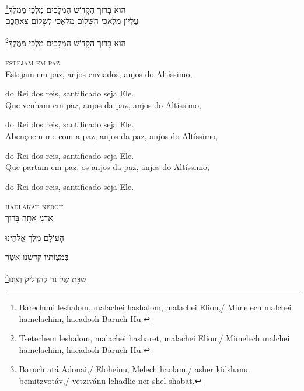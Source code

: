 \footnote{Barechuni leshalom, malachei hashalom, malachei Elion,/ Mimelech malchei hamelachim, hacadosh Baruch Hu.}הוּא בָרוּךְ הַקָדוֹשׁ הַמְלָכִים מַלְכֵי מִמֶלֶךְ\\[10pt] 

עֶלְיוֹן מַלְאָכִי הַשָּׁלוֹם מַלְאֲכֵי לְשָלוֹם צֵאתְכֶם 

\footnote{Tsetechem leshalom, malachei hasharet, malachei Elion,/ Mimelech malchei hamelachim, hacadosh Baruch Hu.}הוּא בָרוּךְ הַקָדוֹשׁ הַמְלָכִים מַלְכֵי מִמֶלֶךְ


\movetooddpage
\raggedright

\vspace*{1cm}

\textsc{estejam em paz}\\[15pt]


Estejam em paz, anjos enviados, anjos do Altíssimo,

do Rei dos reis, santificado seja Ele.\\[10pt]

Que venham em paz, anjos da paz, anjos do Altíssimo,

do Rei dos reis, santificado seja Ele.\\[10pt]

Abençoem-me com a paz, anjos da paz, anjos do Altíssimo,

do Rei dos reis, santificado seja Ele.\\[10pt]

Que partam em paz, os anjos da paz, anjos do Altíssimo,

do Rei dos reis, santificado seja Ele.

\movetoevenpage
\raggedleft




\vspace*{1cm}

\textsc{hadlakat nerot}\\[15pt]

אַדָנָי אַתָּה בָּרוּך

הָעוֹלָם מֶלֶך אֱלהֵינוּ

בְּמִצְוֹתָיו קִדְשָנוּ אַשֶׁר

\footnote{Baruch atá Adonai,/ Eloheinu, Melech haolam,/ asher kidshanu bemitzvotáv,/ vetzivánu lehadlic ner shel shabat.}שַבָּת שֶל נֵר לְהַדְלִיק וְצִוָנוּ‏

\movetooddpage
\raggedright

\vspace*{1cm}

